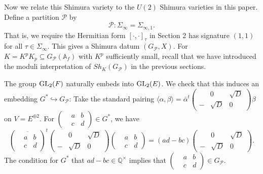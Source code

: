 \documentclass{article}
\begin{document}
Now we relate this Shimura variety to the $U(2)$ Shimura varieties in this paper. Define a partition $\mathcal{P}$ by
\begin{equation}
	\mathcal{P}: \Sigma_{\infty}=\Sigma_{\infty,1}.
\end{equation}
That is, we require the Hermitian form $[\cdot,\cdot]_\tau$ in Section 2 has signature $(1,1)$ for all $\tau\in \Sigma_{\infty}$. This gives a Shimura datum $(G_{\mathcal{P}},X)$. For $K=K^pK_p\subseteq G_{\mathcal{P}}(\mathbb{A}_f)$ with $K^p$ sufficiently small, recall that we have introduced the moduli interpretation of $Sh_K(G_{\mathcal{P}})$ in the previous sections.

The group $\textnormal{GL}_2(F)$ naturally embeds into $\textnormal{GL}_2(E)$. We check that this induces an embedding $G^\ast\hookrightarrow G_{\mathcal{P}}$: Take the standard pairing $\langle\alpha,\beta\rangle=\bar{\alpha}^t\left(
\begin{aligned}
	&0 &\sqrt{D}\\
	-&\sqrt{D} &0
\end{aligned}\right)\beta$ on $V=E^{\oplus 2}$. For $\left(\begin{aligned}
&a&b\\&c&d
\end{aligned}\right)\in G^\ast$, we have
\begin{equation}
	\left(\overline{\begin{aligned}
		&a&b\\&c&d
	\end{aligned}}\right)^t
	\left(\begin{aligned}
		&0&\sqrt{D}\\-&\sqrt{D}&0
	\end{aligned}\right)
	\left(\begin{aligned}
		&a&b\\&c&d
	\end{aligned}\right)=(ad-bc)
	\left(\begin{aligned}
		&0&\sqrt{D}\\-&\sqrt{D}&0
	\end{aligned}\right).
\end{equation}
The condition for $G^\ast$ that $ad-bc\in\mathbb{Q}^\times$ implies that $\left(\begin{aligned}
	&a &b\\
	&c &d
\end{aligned}\right)\in
G_{\mathcal{P}}$.
\end{document}
